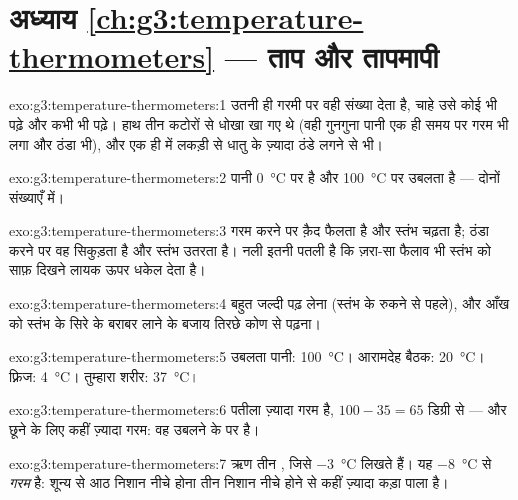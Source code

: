 \section*{अध्याय \ref{ch:g3:temperature-thermometers} --- ताप और तापमापी}

\begin{solution}{exo:g3:temperature-thermometers:1}
उतनी ही गरमी पर  वही संख्या देता है, चाहे उसे कोई भी पढ़े और
कभी भी पढ़े। हाथ तीन कटोरों से धोखा खा गए थे (वही गुनगुना पानी एक ही
समय पर गरम भी लगा और ठंडा भी), और एक ही  में लकड़ी से धातु के
ज़्यादा ठंडे लगने से भी।
\end{solution}

\begin{solution}{exo:g3:temperature-thermometers:2}
पानी \qty{0}{\celsius} पर  है और \qty{100}{\celsius} पर उबलता
है --- दोनों संख्याएँ  में।
\end{solution}

\begin{solution}{exo:g3:temperature-thermometers:3}
गरम करने पर क़ैद  फैलता है और स्तंभ चढ़ता है; ठंडा करने पर वह
सिकुड़ता है और स्तंभ उतरता है। नली इतनी पतली है कि ज़रा-सा फैलाव भी
स्तंभ को साफ़ दिखने लायक ऊपर धकेल देता है।
\end{solution}

\begin{solution}{exo:g3:temperature-thermometers:4}
बहुत जल्दी पढ़ लेना (स्तंभ के रुकने से पहले), और आँख को स्तंभ के सिरे
के बराबर लाने के बजाय तिरछे कोण से पढ़ना।
\end{solution}

\begin{solution}{exo:g3:temperature-thermometers:5}
उबलता पानी: \qty{100}{\celsius}। आरामदेह बैठक:
\qty{20}{\celsius}। फ़्रिज: \qty{4}{\celsius}। तुम्हारा शरीर:
\qty{37}{\celsius}।
\end{solution}

\begin{solution}{exo:g3:temperature-thermometers:6}
पतीला ज़्यादा गरम है, $100 - 35 = 65$ डिग्री से --- और छूने के लिए
कहीं ज़्यादा गरम: वह उबलने के  पर है।
\end{solution}

\begin{solution}{exo:g3:temperature-thermometers:7}
ऋण तीन , जिसे \qty{-3}{\celsius} लिखते हैं। यह
\qty{-8}{\celsius} से \emph{गरम} है: शून्य से आठ निशान नीचे होना तीन
निशान नीचे होने से कहीं ज़्यादा कड़ा पाला है।
\end{solution}

